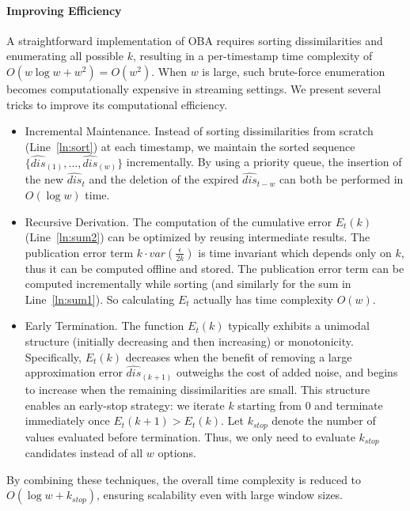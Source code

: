 \documentclass[acmsmall]{acmart}
\newcommand{\hdis}{\hat{\mathit{dis}}}
\newcommand{\var}{\mathit{var}}
\begin{document}
\paragraph{Improving Efficiency}
A straightforward implementation of OBA requires sorting dissimilarities and enumerating all possible $k$, resulting in a per-timestamp time complexity of $O(w\log w + w^2) =
O(w^2)$.
When $w$ is large, such brute-force enumeration becomes computationally
expensive in streaming settings.
We present several tricks to improve its computational efficiency.
\begin{itemize}
\item{Incremental Maintenance.} 
 Instead of sorting dissimilarities from scratch (Line~\ref{ln:sort}) at each timestamp, we maintain the sorted sequence $\{\hdis_{(1)}, \dots, \hdis_{(w)}\}$ incrementally.
 By using a priority queue, the insertion of the new $\hdis_t$ and the deletion of the expired $\hdis_{t-w}$ can both be performed in $O(\log w)$ time.
\item{Recursive Derivation.} The computation of the cumulative error $E_t(k)$ (Line~\ref{ln:sum2}) can be optimized by reusing intermediate results.
The publication error term $k\cdot\var(\frac{\epsilon}{2k})$ is time
  invariant which depends only on $k$, thus it can be computed offline and stored.
  The publication error term can be computed incrementally while sorting (and similarly for the sum in Line~\ref{ln:sum1}).
  So calculating $E_t$ actually has time complexity $O(w)$.
\item{Early Termination.}
    The function $E_t(k)$ typically exhibits a unimodal structure (initially decreasing and then increasing) or monotonicity.
    Specifically, $E_t(k)$ decreases when the benefit of removing a large approximation error $\hdis_{(k+1)}$ outweighs the cost of added noise, and begins to increase when the remaining dissimilarities are small.
    This structure enables an early-stop strategy: we iterate $k$ starting from $0$ and terminate immediately once $E_t(k+1) > E_t(k)$. Let $k_{\mathit{stop}}$ denote the number of values evaluated before termination.
    Thus, we only need to evaluate $k_{\mathit{stop}}$ candidates instead of all $w$ options.
\end{itemize}
By combining these techniques, the overall time complexity is reduced to $O(\log w + k_{\mathit{stop}})$, ensuring scalability even with large window sizes.



\end{document}
